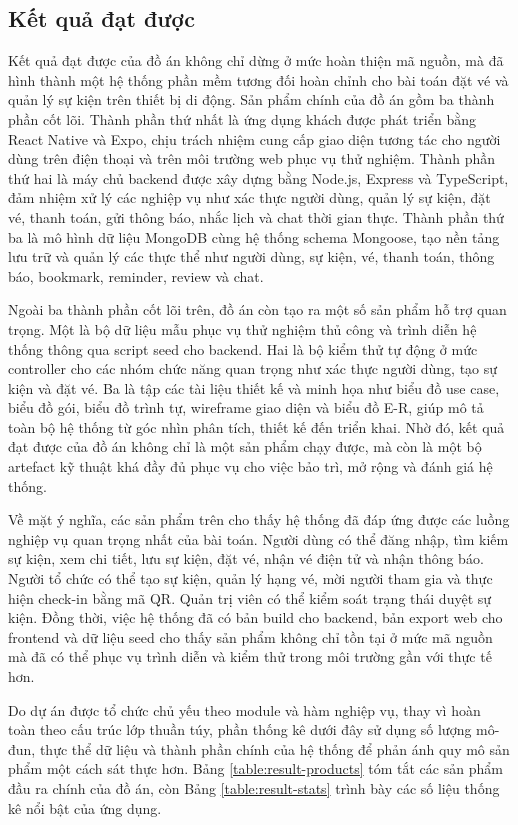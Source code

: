 \documentclass[../DoAn.tex]{subfiles}
\begin{document}
\subsection{Kết quả đạt được}
Kết quả đạt được của đồ án không chỉ dừng ở mức hoàn thiện mã nguồn, mà đã hình thành một hệ thống phần mềm tương đối hoàn chỉnh cho bài toán đặt vé và quản lý sự kiện trên thiết bị di động. Sản phẩm chính của đồ án gồm ba thành phần cốt lõi. Thành phần thứ nhất là ứng dụng khách được phát triển bằng React Native và Expo, chịu trách nhiệm cung cấp giao diện tương tác cho người dùng trên điện thoại và trên môi trường web phục vụ thử nghiệm. Thành phần thứ hai là máy chủ backend được xây dựng bằng Node.js, Express và TypeScript, đảm nhiệm xử lý các nghiệp vụ như xác thực người dùng, quản lý sự kiện, đặt vé, thanh toán, gửi thông báo, nhắc lịch và chat thời gian thực. Thành phần thứ ba là mô hình dữ liệu MongoDB cùng hệ thống schema Mongoose, tạo nền tảng lưu trữ và quản lý các thực thể như người dùng, sự kiện, vé, thanh toán, thông báo, bookmark, reminder, review và chat.

Ngoài ba thành phần cốt lõi trên, đồ án còn tạo ra một số sản phẩm hỗ trợ quan trọng. Một là bộ dữ liệu mẫu phục vụ thử nghiệm thủ công và trình diễn hệ thống thông qua script seed cho backend. Hai là bộ kiểm thử tự động ở mức controller cho các nhóm chức năng quan trọng như xác thực người dùng, tạo sự kiện và đặt vé. Ba là tập các tài liệu thiết kế và minh họa như biểu đồ use case, biểu đồ gói, biểu đồ trình tự, wireframe giao diện và biểu đồ E-R, giúp mô tả toàn bộ hệ thống từ góc nhìn phân tích, thiết kế đến triển khai. Nhờ đó, kết quả đạt được của đồ án không chỉ là một sản phẩm chạy được, mà còn là một bộ artefact kỹ thuật khá đầy đủ phục vụ cho việc bảo trì, mở rộng và đánh giá hệ thống.

Về mặt ý nghĩa, các sản phẩm trên cho thấy hệ thống đã đáp ứng được các luồng nghiệp vụ quan trọng nhất của bài toán. Người dùng có thể đăng nhập, tìm kiếm sự kiện, xem chi tiết, lưu sự kiện, đặt vé, nhận vé điện tử và nhận thông báo. Người tổ chức có thể tạo sự kiện, quản lý hạng vé, mời người tham gia và thực hiện check-in bằng mã \gls{QR}. Quản trị viên có thể kiểm soát trạng thái duyệt sự kiện. Đồng thời, việc hệ thống đã có bản build cho backend, bản export web cho frontend và dữ liệu seed cho thấy sản phẩm không chỉ tồn tại ở mức mã nguồn mà đã có thể phục vụ trình diễn và kiểm thử trong môi trường gần với thực tế hơn.

Do dự án được tổ chức chủ yếu theo module và hàm nghiệp vụ, thay vì hoàn toàn theo cấu trúc lớp thuần túy, phần thống kê dưới đây sử dụng số lượng mô-đun, thực thể dữ liệu và thành phần chính của hệ thống để phản ánh quy mô sản phẩm một cách sát thực hơn. Bảng \ref{table:result-products} tóm tắt các sản phẩm đầu ra chính của đồ án, còn Bảng \ref{table:result-stats} trình bày các số liệu thống kê nổi bật của ứng dụng.
\end{document}
